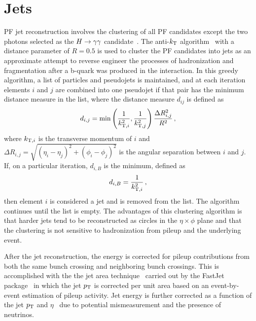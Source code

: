 \section{Jets\label{sec:jets}}

PF jet reconstruction involves the clustering of all PF candidates except the two photons selected
as the $H\to\gamma\gamma$ candidate~\cite{PFPAS2009,CMS-PAS-PFT-10-001}.
The anti-$k_{\rm T}$ algorithm~\cite{Cacciari:2008gp} with a distance parameter of $R = 0.5$ is
used to cluster the PF candidates into jets as an approximate attempt to reverse engineer the
processes of hadronization and fragmentation after a b-quark was produced in the interaction.
In this greedy algorithm, a list of particles and pseudojets is maintained, and at each iteration
elements $i$ and $j$ are combined into one pseudojet if that pair has the minimum distance measure
in the list, where the distance measure $d_{ij}$ is defined as
\begin{equation}
d_{i,j} = \min \left(\frac{1}{k_{{\rm T},i}^2},\frac{1}{k_{{\rm T},j}^2}\right)\frac{\Delta R_{i,j}^2}{R^2} \, ,
\end{equation}
where $k_{{\rm T},i}$ is the transverse momentum of $i$ and $\Delta R_{i,j} = \sqrt{(\eta_i-\eta_j)^2+(\phi_i-\phi_j)^2}$ is the angular separation between $i$ and $j$. If, on a particular iteration,
$d_{i,B}$ is the minimum, defined as
\begin{equation}
d_{i,B} = \frac{1}{k_{{\rm T},i}^2} \, ,
\end{equation}
then element $i$ is considered a jet and is removed from the list. The algorithm continues until the
list is empty.
The advantages of this clustering algorithm is that harder jets tend to be reconstructed as circles
in the $\eta\times\phi$ plane and that the clustering is not sensitive to
hadronization from pileup and the underlying event.

After the jet reconstruction, the energy is corrected for pileup contributions from both the same
bunch crossing and neighboring bunch crossings. This is accomplished with the the
jet area technique~\cite{Cacciari:2007fd} carried out by the FastJet package~\cite{Cacciari:2011ma}
in which the jet $p_{\rm T}$ is corrected per unit area based on an event-by-event estimation of pileup
activity.
Jet energy is further corrected as a function of the jet $p_{\rm T}$ and $\eta$~\cite{JINST6}
due to potential mismeasurement and the presence of neutrinos.

